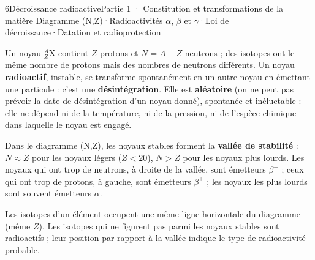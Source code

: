 \begin{ouverture}[radioactivite]{6}{Décroissance radioactive}{Partie 1 · Constitution et transformations de la matière}
{Diagramme (N,Z)\enspace·\enspace Radioactivités $\alpha$, $\beta$ et $\gamma$\enspace·\enspace Loi de décroissance\enspace·\enspace Datation et radioprotection}
\end{ouverture}
\essentiel
{}
\begin{definition}
Un noyau $^A_Z\mathrm{X}$ contient $Z$ protons et $N=A-Z$ neutrons ; des isotopes ont le même nombre de protons
mais des nombres de neutrons différents. Un noyau \textbf{radioactif}, instable, se transforme spontanément en un
autre noyau en émettant une particule : c'est une \textbf{désintégration}. Elle est \textbf{aléatoire} (on ne peut
pas prévoir la date de désintégration d'un noyau donné), spontanée et inéluctable : elle ne dépend ni de la
température, ni de la pression, ni de l'espèce chimique dans laquelle le noyau est engagé.
\end{definition}
\begin{propriete}
Dans le diagramme (N,Z), les noyaux stables forment la \textbf{vallée de stabilité} : $N\approx Z$ pour les noyaux
légers ($Z<20$), $N>Z$ pour les noyaux plus lourds. Les noyaux qui ont trop de neutrons, à droite de la vallée,
sont émetteurs $\beta^-$ ; ceux qui ont trop de protons, à gauche, sont émetteurs $\beta^+$ ; les noyaux les plus
lourds sont souvent émetteurs $\alpha$.
\end{propriete}
\begin{savoirfaire}
Les isotopes d'un élément occupent une même ligne horizontale du diagramme (même $Z$). Les isotopes qui ne
figurent pas parmi les noyaux stables sont radioactifs ; leur position par rapport à la vallée indique le type de
radioactivité probable.
\end{savoirfaire}

